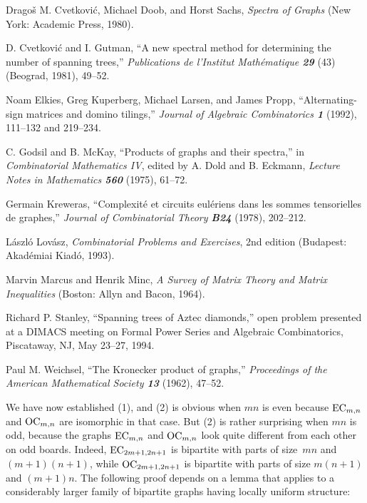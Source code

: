 \bib
[\CDS]
Drago{\v s} M. Cvetkovi\'c, Michael Doob, and Horst Sachs, {\sl Spectra of
Graphs\/} (New York: Academic Press, 1980).

\bib
[\CG]
D. Cvetkovi\'c and I. Gutman, ``A new spectral method for determining the
number of spanning trees,'' {\sl Publications de l'Institut Math\'ematique\/
\bf 29} (43) (Beograd, 1981), 49--52.

\bib
[\EKLP]
Noam Elkies, Greg Kuperberg, Michael Larsen, and James Propp,
``Alternating-sign matrices and domino tilings,''
{\sl Journal of Algebraic Combinatorics\/ \bf 1} (1992), 111--132 and 219--234.

\bib
[\GM]
C. Godsil and B. McKay, ``Products of graphs and their spectra,'' in
{\sl Combinatorial Mathematics IV}, edited by A. Dold and B. Eckmann,
{\sl Lecture Notes in Mathematics\/ \bf560} (1975), 61--72.

\bib
[\Krew]
Germain Kreweras, ``Complexit\'e et circuits eul\'eriens dans les sommes
tensorielles de graphes,'' {\sl Journal of Combinatorial Theory\/ \bf B24}
(1978), 202--212.

\bib
[\Lov]
L\'aszl\'o Lov\'asz, {\sl Combinatorial Problems and Exercises}, 2nd edition
(Budapest: Akad\'emiai Kiad\'o, 1993).

\bib
[\MaMi]
Marvin Marcus and Henrik Minc, {\sl A Survey of Matrix Theory and Matrix
Inequalities\/} (Boston: Allyn and Bacon, 1964).

\bib
[\Stan]
Richard P. Stanley, ``Spanning trees of Aztec diamonds,'' open problem
presented at a DIMACS meeting on Formal Power Series and Algebraic
Combinatorics, Piscataway, NJ, May 23--27, 1994.

\bib
[\Wei]
Paul M. Weichsel, ``The Kronecker product of graphs,'' {\sl Proceedings of the
American Mathematical Society\/ \bf 13} (1962), 47--52.




\bye

We have now established (1), and (2) is obvious when $mn$ is even because
${\rm EC}_{m,n}$ and ${\rm OC}_{m,n}$ are isomorphic in that case. But (2) is rather
surprising when $mn$ is odd, because the graphs ${\rm EC}_{m,n}$ and ${\rm OC}_{m,n}$
look quite different from each other on odd boards. Indeed, ${\rm EC}_{2m+1,2n+1}$
is bipartite with parts of size~$mn$ and $(m+1)(n+1)$, while ${\rm OC}_{2m+1,2n+1}$
is bipartite with parts of size $m(n+1)$ and $(m+1)n$. The following proof
depends on a lemma that applies to a considerably larger family of bipartite
graphs having locally uniform structure:

